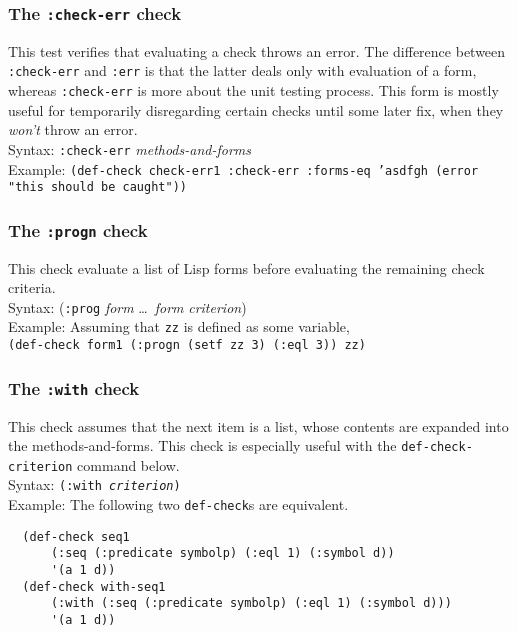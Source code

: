 \documentclass{article}
\begin{document}
\subsubsection{The \texttt{:check-err} check }
This test verifies that evaluating a check throws an
error. The difference between
\texttt{:check-err} and \texttt{:err} is that the latter deals only
with evaluation of a form, whereas \texttt{:check-err} is more about
the unit testing process.  This form is mostly useful for temporarily
disregarding certain checks until some later fix, when they
\emph{won't} throw an error.
%
\\ Syntax: \texttt{:check-err} \textit{methods-and-forms}
\\ Example: \texttt{(def-check check-err1 :check-err :forms-eq 'asdfgh (error "this should be caught"))}

\subsubsection{The \texttt{:progn} check}
This check evaluate a list of Lisp forms before evaluating the
remaining check criteria.
\\ Syntax: (\texttt{:prog} \textit{form} \ldots\ \textit{form} \textit{criterion})
\\ Example: Assuming that \texttt{zz} is defined as some variable,
\\ \hspace*{2em}\texttt{(def-check form1 (:progn (setf zz 3) (:eql 3)) zz)}

\subsubsection{The \texttt{:with} check}
\par
This check assumes that the next item is a list, whose contents are
expanded into the methods-and-forms. This
check is especially useful with the \texttt{def-check-cri\-ter\-ion}
command below.
\\ Syntax: \texttt{(:with \emph{criterion})}
\\ Example: The following two \texttt{def-check}s are equivalent.
\begin{verbatim}
  (def-check seq1
      (:seq (:predicate symbolp) (:eql 1) (:symbol d))
      '(a 1 d))
  (def-check with-seq1
      (:with (:seq (:predicate symbolp) (:eql 1) (:symbol d)))
      '(a 1 d))
\end{verbatim}
\end{document}
